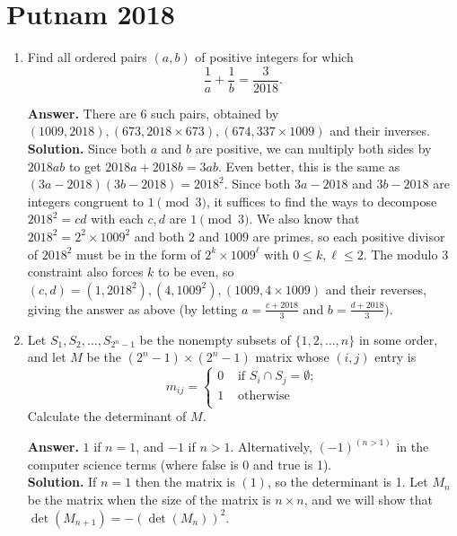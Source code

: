 \documentclass[11pt,a4paper]{article}
\newcommand{\<}{\langle}
\renewcommand{\>}{\rangle}
\begin{document}
\newcommand{\sgn}{\text{sgn}}
\setcounter{secnumdepth}{0}

\section{Putnam 2018}
\begin{enumerate}
	\item [\textbf{A1}]
	Find all ordered pairs $(a, b)$ of positive integers for which
	\[\frac{1}{a} + \frac{1}{b} = \frac{3}{2018}.\]
	
	\textbf{Answer.} There are 6 such pairs, obtained by $(1009, 2018), (673, 2018\times 673), (674, 337\times 1009)$ and their inverses. \\
	\textbf{Solution.} Since both $a$ and $b$ are positive, we can multiply both sides by $2018ab$ to get $2018a+2018b=3ab$. Even better, this is the same as $(3a-2018)(3b-2018)=2018^2$. Since both $3a-2018$ and $3b-2018$ are integers congruent to $1\pmod{3}$, it suffices to find the ways to decompose $2018^2=cd$ with each $c, d$ are $1\pmod{3}$. We also know that $2018^2=2^2\times 1009^2$ and both $2$ and $1009$ are primes, so each positive divisor of $2018^2$ must be in the form of $2^{k}\times 1009^{\ell}$ with $0\le k, \ell \le 2$. 
	The modulo 3 constraint also forces $k$ to be even, so $(c, d)=(1, 2018^2), (4, 1009^2), (1009, 4\times 1009)$ and their reverses, giving the answer as above (by letting $a=\frac{c+2018}{3}$ and $b=\frac{d+2018}{3}$). 
	
	\item[\textbf{A2}]
	
	Let $S_1, S_2, \dots, S_{2^n - 1}$ be the nonempty subsets of $\{1, 2, \dots, n\}$ in some order, and let $M$ be the $(2^n - 1) \times (2^n - 1)$ matrix whose $(i, j)$ entry is
	\[m_{ij}=\begin{cases}
	0 & \text{ if } S_i\cap S_j=\emptyset;\\
	1 & \text{ otherwise }\\
	\end{cases}\]
	Calculate the determinant of $M$.
	
	\textbf{Answer.} $1$ if $n=1$, and $-1$ if $n>1$. Alternatively, $(-1)^{(n>1)}$ in the computer science terms (where false is 0 and true is 1). \\
	\textbf{Solution.} If $n=1$ then the matrix is $(1)$, so the determinant is 1. Let $M_n$ be the matrix when the size of the matrix is $n\times n$, and we will show that $\det(M_{n+1})=-(\det(M_n))^2$. 
	

\end{enumerate}
\end{document}
